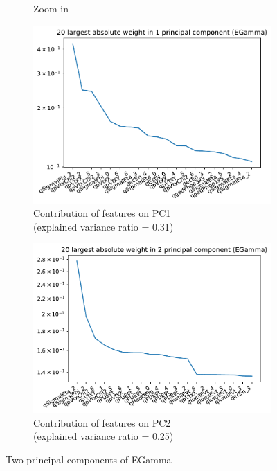 \begin{figure}[h!]
\begin{subfigure}[b]{0.49\linewidth}
        \caption{Zoom in}
    \end{subfigure}
    \begin{subfigure}[b]{0.49\linewidth}
        \includegraphics[width=\linewidth]{images/reco/2018/feature_2/EGamma_pc1.pdf}
        \caption{Contribution of features on PC1 \\ (explained variance ratio = 0.31)}
    \end{subfigure}
    \begin{subfigure}[b]{0.49\linewidth}
        \includegraphics[width=\linewidth]{images/reco/2018/feature_2/EGamma_pc2.pdf}
        \caption{Contribution of features on PC2 \\ (explained variance ratio = 0.25)}
    \end{subfigure}
\caption{Two principal components of EGamma}
\label{fig:2018_EGamma_subsystem_label}
\end{figure}

